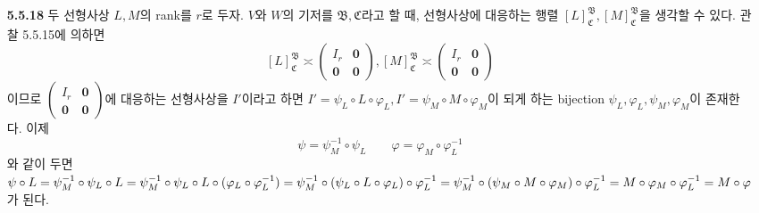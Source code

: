 \documentclass{article}
\newcommand*{\basisB}{\mathfrak{B}}%
\newcommand*{\basisC}{\mathfrak{C}}%
\begin{document}
\begin{itemize}
\item[\textbf{5.5.18}] 두 선형사상 $L, M$의 rank를 $r$로 두자. $V$와 $W$의 기저를 $\basisB, \basisC$라고 할 때, 선형사상에 대응하는 행렬 $\left[L\right]_{\basisC}^{\basisB}, \left[M\right]_{\basisC}^{\basisB}$을 생각할 수 있다. 관찰 5.5.15에 의하면 $$\left[L\right]_{\basisC}^{\basisB} \asymp 
\begin{pmatrix}
	I_r & \mathbf{0}\\
	\mathbf{0} & \mathbf{0}
\end{pmatrix}, \left[M\right]_{\basisC}^{\basisB} \asymp \begin{pmatrix}
	I_r & \mathbf{0}\\
	\mathbf{0} & \mathbf{0}
\end{pmatrix}$$ 이므로 $\begin{pmatrix}
	I_r & \mathbf{0}\\
	\mathbf{0} & \mathbf{0}
\end{pmatrix}$에 대응하는 선형사상을 $I'$이라고 하면 $I'=\psi_L \circ L \circ \varphi_L, I' = \psi_M \circ M \circ \varphi_M$이 되게 하는 bijection $\psi_L, \varphi_L, \psi_M, \varphi_M$이 존재한다. 이제 $$\psi = \psi_M^{-1} \circ \psi_L \qquad \varphi = \varphi_M \circ \varphi_L^{-1}$$와 같이 두면 $\psi \circ L = \psi_M^{-1} \circ \psi_L \circ L = \psi_M^{-1} \circ \psi_L \circ L \circ (\varphi_L \circ \varphi_L^{-1}) = \psi_M^{-1} \circ (\psi_L \circ L \circ \varphi_L) \circ \varphi_L^{-1} \\ = \psi_M^{-1} \circ (\psi_M \circ M \circ \varphi_M) \circ \varphi_L^{-1} = M \circ \varphi_M \circ \varphi_L^{-1} = M\circ \varphi$ 가 된다.


\end{itemize}
\end{document}

